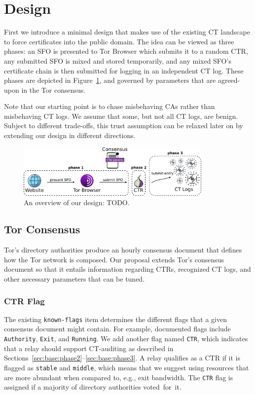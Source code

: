\section{Design} \label{sec:base}
First we introduce a minimal design that makes use of the existing CT landscape
to force certificates into the public domain.  The idea can be viewed as
three phases:
	an SFO is presented to Tor Browser which submits it to a random CTR,
	any submitted SFO is mixed and stored temporarily, and
	any mixed SFO's certificate chain is then submitted for logging in an
		independent CT log.
These phases are depicted in Figure~\ref{fig:design-ca}, and governed by
parameters that are agreed-upon in the Tor consensus.

Note that our starting point is to chase misbehaving CAs rather than
misbehaving CT logs.  We assume that some, but not all CT logs, are benign.
Subject to different trade-offs, this trust assumption can be relaxed later on
by extending our design in different directions.

\begin{figure}
	\centering
	\includegraphics[width=0.85\textwidth]{img/design-ca}
	\caption{An overview of our design: TODO. }
	\label{fig:design-ca}
\end{figure}

\subsection{Tor Consensus} \label{sec:base:consensus}
Tor's directory authorities produce an hourly consensus document that defines
how the Tor network is composed.  Our proposal extends Tor's consensus document
so that it entails information regarding
	CTRs,
	recognized CT logs, and
	other necessary parameters that can be tuned.

\subsubsection{CTR Flag} \label{sec:base:consensus:ctr-flag}
The existing \texttt{known-flags} item determines the different flags that a 
given consensus document might contain.  For example, documented flags include
\texttt{Authority}, \texttt{Exit}, and \texttt{Running}.  We add another flag
named \texttt{CTR}, which indicates that a relay should support CT-auditing as
described in Sections~\ref{sec:base:phase2}--\ref{sec:base:phase3}.  A
relay qualifies as a CTR if it is flagged as \texttt{stable} and
\texttt{middle}, which means that we suggest using resources that are more
abundant when compared to, e.g., exit bandwidth.  The \texttt{CTR} flag is
assigned if a majority of directory authorities voted~for~it.

